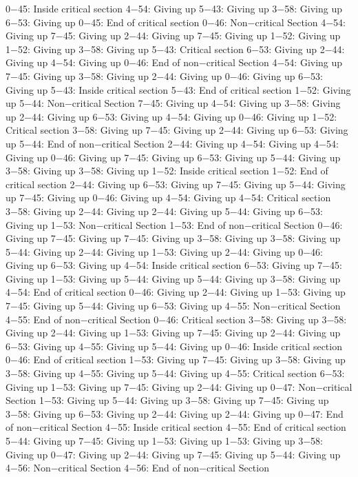 0−45: Inside critical section
4−54: Giving up
5−43: Giving up
3−58: Giving up
6−53: Giving up
0−45: End of critical section
0−46: Non−critical Section
4−54: Giving up
7−45: Giving up
2−44: Giving up
7−45: Giving up
1−52: Giving up
1−52: Giving up
3−58: Giving up
5−43: Critical section
6−53: Giving up
2−44: Giving up
4−54: Giving up
0−46: End of non−critical Section
4−54: Giving up
7−45: Giving up
3−58: Giving up
2−44: Giving up
0−46: Giving up
6−53: Giving up
5−43: Inside critical section
5−43: End of critical section
1−52: Giving up
5−44: Non−critical Section
7−45: Giving up
4−54: Giving up
3−58: Giving up
2−44: Giving up
6−53: Giving up
4−54: Giving up
0−46: Giving up
1−52: Critical section
3−58: Giving up
7−45: Giving up
2−44: Giving up
6−53: Giving up
5−44: End of non−critical Section
2−44: Giving up
4−54: Giving up
4−54: Giving up
0−46: Giving up
7−45: Giving up
6−53: Giving up
5−44: Giving up
3−58: Giving up
3−58: Giving up
1−52: Inside critical section
1−52: End of critical section
2−44: Giving up
6−53: Giving up
7−45: Giving up
5−44: Giving up
7−45: Giving up
0−46: Giving up
4−54: Giving up
4−54: Critical section
3−58: Giving up
2−44: Giving up
2−44: Giving up
5−44: Giving up
6−53: Giving up
1−53: Non−critical Section
1−53: End of non−critical Section
0−46: Giving up
7−45: Giving up
7−45: Giving up
3−58: Giving up
3−58: Giving up
5−44: Giving up
2−44: Giving up
1−53: Giving up
2−44: Giving up
0−46: Giving up
6−53: Giving up
4−54: Inside critical section
6−53: Giving up
7−45: Giving up
1−53: Giving up
5−44: Giving up
5−44: Giving up
3−58: Giving up
4−54: End of critical section
0−46: Giving up
2−44: Giving up
1−53: Giving up
7−45: Giving up
5−44: Giving up
6−53: Giving up
4−55: Non−critical Section
4−55: End of non−critical Section
0−46: Critical section
3−58: Giving up
3−58: Giving up
2−44: Giving up
1−53: Giving up
7−45: Giving up
2−44: Giving up
6−53: Giving up
4−55: Giving up
5−44: Giving up
0−46: Inside critical section
0−46: End of critical section
1−53: Giving up
7−45: Giving up
3−58: Giving up
3−58: Giving up
4−55: Giving up
5−44: Giving up
4−55: Critical section
6−53: Giving up
1−53: Giving up
7−45: Giving up
2−44: Giving up
0−47: Non−critical Section
1−53: Giving up
5−44: Giving up
3−58: Giving up
7−45: Giving up
3−58: Giving up
6−53: Giving up
2−44: Giving up
2−44: Giving up
0−47: End of non−critical Section
4−55: Inside critical section
4−55: End of critical section
5−44: Giving up
7−45: Giving up
1−53: Giving up
1−53: Giving up
3−58: Giving up
0−47: Giving up
2−44: Giving up
7−45: Giving up
5−44: Giving up
4−56: Non−critical Section
4−56: End of non−critical Section
